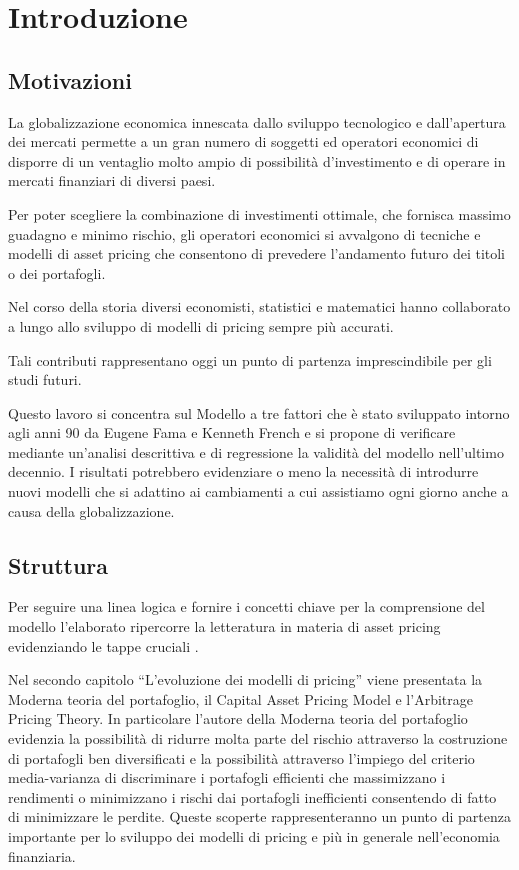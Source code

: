 \chapter{Introduzione}

\section{Motivazioni}
La globalizzazione economica innescata dallo sviluppo tecnologico e dall'apertura dei mercati permette a un gran numero di soggetti ed operatori economici di disporre di un ventaglio molto ampio di possibilità d'investimento e di operare in mercati finanziari di diversi paesi. 

Per poter scegliere la combinazione di investimenti ottimale, che fornisca massimo guadagno e minimo rischio,  gli operatori economici si avvalgono di tecniche e modelli di asset pricing che consentono di prevedere l'andamento futuro dei titoli o dei portafogli.  

Nel corso della storia diversi economisti, statistici e matematici hanno collaborato a lungo allo sviluppo di modelli di pricing sempre più accurati. 

Tali contributi rappresentano oggi un punto di partenza imprescindibile per gli studi futuri.   

Questo lavoro si concentra sul Modello a tre fattori che è stato sviluppato intorno agli anni 90 da Eugene Fama e Kenneth French e si propone di verificare mediante un'analisi descrittiva e di regressione la validità del modello nell'ultimo decennio. I risultati potrebbero evidenziare o meno la necessità di introdurre nuovi modelli che si adattino ai cambiamenti a cui assistiamo ogni giorno anche a causa della globalizzazione.

\section{Struttura}

Per seguire una linea logica e fornire i concetti chiave per la comprensione del modello l'elaborato ripercorre la letteratura in materia di asset pricing evidenziando le tappe cruciali \cite{noauthor_economia_2020}.  
 
Nel secondo capitolo “L'evoluzione dei modelli di pricing” viene presentata la Moderna teoria del portafoglio, il Capital Asset Pricing Model e l'Arbitrage Pricing Theory. In particolare l'autore della Moderna teoria del portafoglio evidenzia la possibilità di ridurre molta parte del rischio attraverso la costruzione di portafogli ben diversificati e la possibilità attraverso l'impiego del criterio media-varianza di discriminare i portafogli efficienti che massimizzano i rendimenti o minimizzano i rischi dai portafogli inefficienti consentendo di fatto di minimizzare le perdite. Queste scoperte rappresenteranno un punto di partenza importante per lo sviluppo dei modelli di pricing e più in generale nell'economia finanziaria.  

